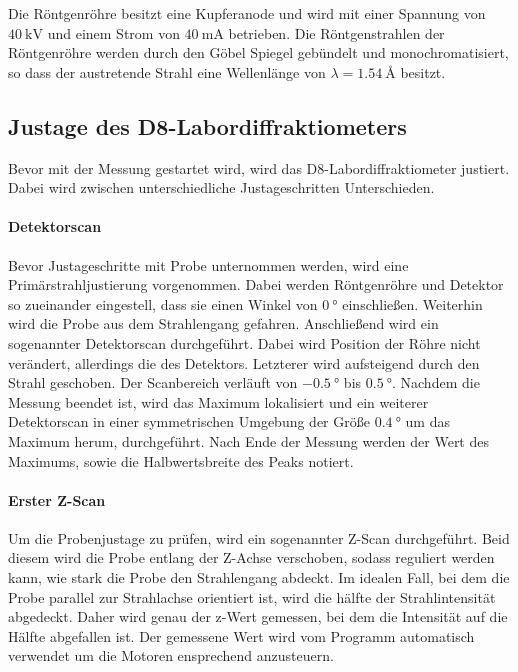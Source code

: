 Die Röntgenröhre besitzt eine Kupferanode und wird mit einer Spannung von $\SI{40}{\kilo\volt}$
und einem Strom von $\SI{40}{\milli\ampere}$ betrieben.
Die Röntgenstrahlen der Röntgenröhre werden durch den Göbel Spiegel
gebündelt und monochromatisiert,
so dass der austretende Strahl eine Wellenlänge von
$\lambda=\SI{1.54}{\angstrom}$ besitzt.


\subsection{Justage des D8-Labordiffraktiometers}
\label{subsec:justage}
Bevor mit der Messung gestartet wird, wird das D8-Labordiffraktiometer
justiert. Dabei wird zwischen unterschiedliche Justageschritten Unterschieden.




\paragraph{Detektorscan}
Bevor Justageschritte mit Probe unternommen werden, wird eine Primärstrahljustierung
vorgenommen. Dabei werden Röntgenröhre und Detektor so zueinander eingestell,
dass sie einen Winkel von $\SI{0}{\degree}$ einschließen. Weiterhin wird die
Probe aus dem Strahlengang gefahren.
Anschließend wird ein sogenannter Detektorscan durchgeführt.
Dabei wird Position der Röhre nicht verändert, allerdings die des Detektors.
Letzterer wird aufsteigend durch den Strahl geschoben. Der Scanbereich
verläuft von $\SI{-0.5}{\degree}$ bis $\SI{0.5}{\degree}$. Nachdem die Messung beendet ist,
wird das Maximum lokalisiert und ein weiterer Detektorscan in einer symmetrischen
Umgebung der Größe $\SI{0.4}{\degree}$ um das Maximum herum, durchgeführt.
Nach Ende der Messung werden der Wert des Maximums, sowie die Halbwertsbreite
des Peaks notiert.

\paragraph{Erster Z-Scan}
Um die Probenjustage zu prüfen,
wird ein sogenannter Z-Scan durchgeführt.
Beid diesem wird die Probe entlang der Z-Achse verschoben,
sodass reguliert werden kann, wie stark die Probe den Strahlengang
abdeckt. Im idealen Fall, bei dem die Probe parallel zur Strahlachse
orientiert ist, wird die hälfte der Strahlintensität abgedeckt.
Daher wird genau der z-Wert gemessen, bei dem die Intensität auf
die Hälfte abgefallen ist. Der gemessene Wert wird vom Programm automatisch
verwendet um die Motoren ensprechend anzusteuern.


